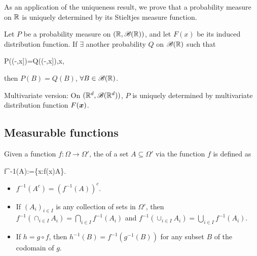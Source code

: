 \documentclass[10pt,a4paper]{article}
\begin{document}
As an application of the uniqueness result, we prove that a probability measure on $\mathbb R$ is
uniquely determined by its Stieltjes measure function.
\begin{thmbox}
	\begin{theorem}\label{thm:unique-prob-measure}\rm
		Let $P$ be a probability measure on $(\mathbb R,\mathscr{B}(\mathbb R))$, and let $F(x)$ be its induced distribution function. If $\exists$ another probability $Q$ on $\mathscr{B}(\mathbb R)$ such that 
		\begin{sequation*}
			P((-\infty ,x])=Q((-\infty ,x]),\quad \forall x\in\bbR,
		\end{sequation*}      
	then $P(B)=Q(B)$, $\forall B\in\mathscr{B}(\mathbb R)$.  
	\end{theorem}
\end{thmbox}
Multivariate version: On $(\mathbb R^d,\mathscr{B}(\mathbb R^d))$, $P$ is uniquely determined by multivariate distribution function $F({\boldsymbol x})$.   

\subsection{Measurable functions}\label{sec:mea}

Given a function $f:\Omega\to\Omega'$, the  of a set $A\subseteq\Omega'$ via the function $f$ is defined as 
\begin{sequation*}
	f^{-1}(A):=\{x\in\Omega:f(x)\in A\}.
\end{sequation*}  
\begin{itemize}
	\item $f^{-1}(A^c)=(f^{-1}(A))^c$.
	\item If $(A_i)_{i\in I}$ is any collection of sets in $\Omega'$, then $f^{-1}(\cap_{i\in I}A_i)=\bigcap_{i\in I}f^{-1}(A_i)$ and $f^{-1}(\cup_{i\in I}A_i)=\bigcup_{i\in I}f^{-1}(A_i).$
	\item If $h=g\circ f$, then $h^{-1}(B)=f^{-1}(g^{-1}(B))$ for any subset $B$ of the codomain of $g$.    
\end{itemize}
\end{document}
